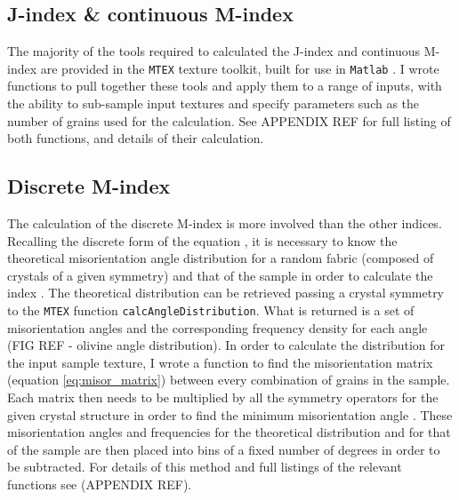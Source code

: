\documentclass[a4paper,12pt]{report}
\numberwithin{equation}{chapter}
\begin{document}
\subsection{J-index \& continuous M-index}
The majority of the tools required to calculated the J-index and continuous M-index are provided in the \texttt{MTEX} texture toolkit, built for use in \texttt{Matlab} \citep{Mainprice}. I wrote functions to pull together these tools and apply them to a range of inputs, with the ability to sub-sample input textures and specify parameters such as the number of grains used for the calculation. See APPENDIX REF for full listing of both functions, and details of their calculation.

\subsection{Discrete M-index}
The calculation of the discrete M-index is more involved than the other indices. Recalling the discrete form of the equation \citep[][equation \ref{eq:Mindex_disc}]{Skemer}, it is necessary to know the theoretical misorientation angle distribution for a random fabric (composed of crystals of a given symmetry) and that of the sample in order to calculate the index . The theoretical distribution can be retrieved passing a crystal symmetry to the \texttt{MTEX} function \texttt{calcAngleDistribution}. What is returned is a set of misorientation angles and the corresponding frequency density for each angle (FIG REF - olivine angle distribution). In order to calculate the distribution for the input sample texture, I wrote a function to find the misorientation matrix (equation \ref{eq:misor_matrix}) between every combination of grains in the sample. Each matrix then needs to be multiplied by all the symmetry operators for the given crystal structure in order to find the minimum misorientation angle \citep[sometimes called the disorientation, for details see *APPENDIX REF* and][]{Grimmer1979}. These misorientation angles and frequencies for the theoretical distribution and for that of the sample are then placed into bins of a fixed number of degrees in order to be subtracted. For details of this method and full listings of the relevant functions see (APPENDIX REF).     
\end{document}
